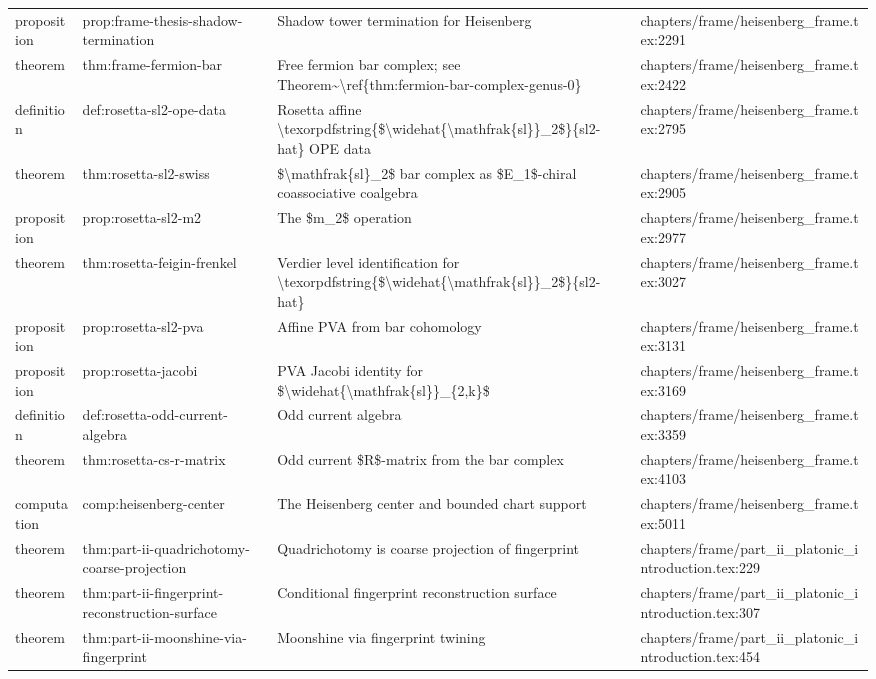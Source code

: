 \documentclass[11pt]{article}
\begin{document}
\begin{longtable}{L{0.10\textwidth}L{0.26\textwidth}L{0.42\textwidth}L{0.22\textwidth}}
proposition & prop:frame-thesis-shadow-termination & Shadow tower termination for Heisenberg & chapters/frame/heisenberg\_frame.tex:2291\\
theorem & thm:frame-fermion-bar & Free fermion bar complex; see Theorem\textasciitilde{}\textbackslash{}ref\{thm:fermion-bar-complex-genus-0\} & chapters/frame/heisenberg\_frame.tex:2422\\
definition & def:rosetta-sl2-ope-data & Rosetta affine \textbackslash{}texorpdfstring\{\$\textbackslash{}widehat\{\textbackslash{}mathfrak\{sl\}\}\_2\$\}\{sl2-hat\} OPE data & chapters/frame/heisenberg\_frame.tex:2795\\
theorem & thm:rosetta-sl2-swiss & \$\textbackslash{}mathfrak\{sl\}\_2\$ bar complex as \$E\_1\$-chiral coassociative coalgebra & chapters/frame/heisenberg\_frame.tex:2905\\
proposition & prop:rosetta-sl2-m2 & The \$m\_2\$ operation & chapters/frame/heisenberg\_frame.tex:2977\\
theorem & thm:rosetta-feigin-frenkel & Verdier level identification for \textbackslash{}texorpdfstring\{\$\textbackslash{}widehat\{\textbackslash{}mathfrak\{sl\}\}\_2\$\}\{sl2-hat\} & chapters/frame/heisenberg\_frame.tex:3027\\
proposition & prop:rosetta-sl2-pva & Affine PVA from bar cohomology & chapters/frame/heisenberg\_frame.tex:3131\\
proposition & prop:rosetta-jacobi & PVA Jacobi identity for \$\textbackslash{}widehat\{\textbackslash{}mathfrak\{sl\}\}\_\{2,k\}\$ & chapters/frame/heisenberg\_frame.tex:3169\\
definition & def:rosetta-odd-current-algebra & Odd current algebra & chapters/frame/heisenberg\_frame.tex:3359\\
theorem & thm:rosetta-cs-r-matrix & Odd current \$R\$-matrix from the bar complex & chapters/frame/heisenberg\_frame.tex:4103\\
computation & comp:heisenberg-center & The Heisenberg center and bounded chart support & chapters/frame/heisenberg\_frame.tex:5011\\
theorem & thm:part-ii-quadrichotomy-coarse-projection & Quadrichotomy is coarse projection of fingerprint & chapters/frame/part\_ii\_platonic\_introduction.tex:229\\
theorem & thm:part-ii-fingerprint-reconstruction-surface & Cond{}itional fingerprint reconstruction surface & chapters/frame/part\_ii\_platonic\_introduction.tex:307\\
theorem & thm:part-ii-moonshine-via-fingerprint & Moonshine via fingerprint twining & chapters/frame/part\_ii\_platonic\_introduction.tex:454\\

\end{longtable}
\end{document}
